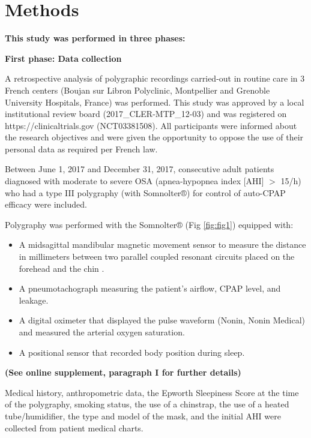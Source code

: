 \section{Methods}
\label{sec:methods}

\textbf{This study was performed in three phases:}

\medbreak

\textbf{First phase: Data collection}

A retrospective analysis of polygraphic recordings carried-out in routine care in 3 French centers (Boujan sur Libron Polyclinic, Montpellier and Grenoble University Hospitals, France) was performed. This study was approved by a local institutional review board (2017\_CLER-MTP\_12-03) and was registered on https://clinicaltrials.gov (NCT03381508). All participants were informed about the research objectives and were given the opportunity to oppose the use of their personal data as required per French law.

Between June 1, 2017 and December 31, 2017, consecutive adult patients diagnosed with moderate to severe OSA (apnea-hypopnea index [AHI] $>$ 15/h) who had a type III polygraphy  (with Somnolter®)  for control of auto-CPAP efficacy were included.

Polygraphy was performed with the Somnolter® (Fig \ref{fig:fig1}) equipped with:
\begin{itemize}
    \item A midsagittal mandibular magnetic movement sensor to measure the distance in millimeters between two parallel coupled resonant circuits placed on the forehead and the chin \citep{senny}.
    \item A pneumotachograph measuring the patient’s airflow, CPAP level, and leakage.
    \item A digital oximeter that displayed the pulse waveform (Nonin, Nonin Medical) and measured the arterial oxygen saturation.
    \item A positional sensor that recorded body position during sleep.
\end{itemize}

\textbf{(See online supplement, paragraph I for further details)}
 
 Medical history, anthropometric data, the Epworth Sleepiness Score at the time of the polygraphy, smoking status, the use of a chinstrap, the use of a heated tube/humidifier, the type and model of the mask, and the initial AHI were collected from patient medical charts.
 
